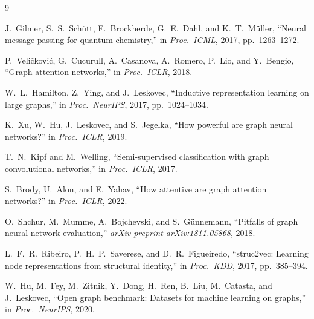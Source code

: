 \begin{thebibliography}{9}

J.\ Gilmer, S.\ S.\ Schütt, F.\ Brockherde, G.\ E.\ Dahl, and K.\ T.\ Müller,
``Neural message passing for quantum chemistry,''
in \textit{Proc.\ ICML}, 2017, pp.\ 1263--1272.

P.\ Veli\v{c}kovi\'{c}, G.\ Cucurull, A.\ Casanova, A.\ Romero, P.\ Lio, and Y.\ Bengio,
``Graph attention networks,''
in \textit{Proc.\ ICLR}, 2018.

W.\ L.\ Hamilton, Z.\ Ying, and J.\ Leskovec,
``Inductive representation learning on large graphs,''
in \textit{Proc.\ NeurIPS}, 2017, pp.\ 1024--1034.

K.\ Xu, W.\ Hu, J.\ Leskovec, and S.\ Jegelka,
``How powerful are graph neural networks?''
in \textit{Proc.\ ICLR}, 2019.

T.\ N.\ Kipf and M.\ Welling,
``Semi-supervised classification with graph convolutional networks,''
in \textit{Proc.\ ICLR}, 2017.

S.\ Brody, U.\ Alon, and E.\ Yahav,
``How attentive are graph attention networks?''
in \textit{Proc.\ ICLR}, 2022.

O.\ Shchur, M.\ Mumme, A.\ Bojchevski, and S.\ Günnemann,
``Pitfalls of graph neural network evaluation,''
\textit{arXiv preprint arXiv:1811.05868}, 2018.

L.\ F.\ R.\ Ribeiro, P.\ H.\ P.\ Saverese, and D.\ R.\ Figueiredo,
``struc2vec: Learning node representations from structural identity,''
in \textit{Proc.\ KDD}, 2017, pp.\ 385--394.

W.\ Hu, M.\ Fey, M.\ Zitnik, Y.\ Dong, H.\ Ren, B.\ Liu, M.\ Catasta, and J.\ Leskovec,
``Open graph benchmark: Datasets for machine learning on graphs,''
in \textit{Proc.\ NeurIPS}, 2020.

\end{thebibliography}


